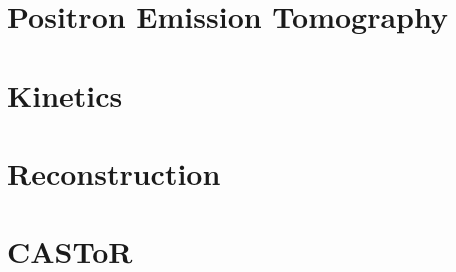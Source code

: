 
\chapter{Positron Emission Tomography}
\minitoc
 

\chapter{Kinetics}


\chapter{Reconstruction}


\chapter{CASToR}

